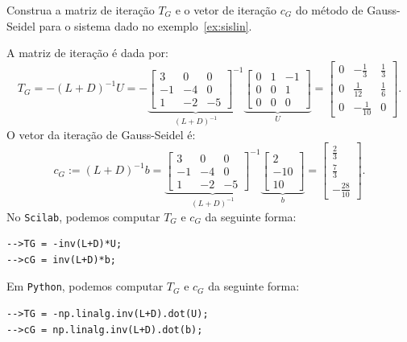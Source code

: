 \begin{ex}
  Construa a matriz de iteração $T_G$ e o vetor de iteração $c_G$ do método de Gauss-Seidel para o sistema dado no exemplo~\ref{ex:sislin}.
\end{ex}
\begin{sol}
  A matriz de iteração é dada por:
  \begin{equation*}
    T_G = -(L+D)^{-1}U = -
     \underbrace{\begin{bmatrix}
      3 & 0 & 0\\
      -1 & -4 & 0\\
      1 & -2 & -5
    \end{bmatrix}^{-1}}_{(L + D)^{-1}}
  \underbrace{\begin{bmatrix}
    0 & 1 & -1\\
    0 & 0 & 1\\
    0 & 0 & 0
  \end{bmatrix}}_{U} =
\begin{bmatrix}
  0 & -\frac{1}{3} & \frac{1}{3}\\
  0 & \frac{1}{12} & \frac{1}{6}\\
  0 & -\frac{1}{10} & 0
\end{bmatrix}.
  \end{equation*}
O vetor da iteração de Gauss-Seidel é:
\begin{equation*}
  c_G := (L+D)^{-1}b = 
    \underbrace{\begin{bmatrix}
      3 & 0 & 0\\
      -1 & -4 & 0\\
      1 & -2 & -5
    \end{bmatrix}^{-1}}_{(L + D)^{-1}}
    \underbrace{\begin{bmatrix}
      2\\
      -10\\
      10
    \end{bmatrix}}_{b} = 
    \begin{bmatrix}
      \frac{2}{3}\\
      \frac{7}{3}\\
      -\frac{28}{10}
    \end{bmatrix}.
\end{equation*}
\ifisscilab
No \verb+Scilab+, podemos computar $T_G$ e $c_G$ da seguinte forma:
\begin{verbatim}
-->TG = -inv(L+D)*U;
-->cG = inv(L+D)*b;
\end{verbatim}
\fi
\ifispython
Em \verb+Python+, podemos computar $T_G$ e $c_G$ da seguinte forma:
\begin{verbatim}
-->TG = -np.linalg.inv(L+D).dot(U);
-->cG = np.linalg.inv(L+D).dot(b);
\end{verbatim}
\fi
\end{sol}

